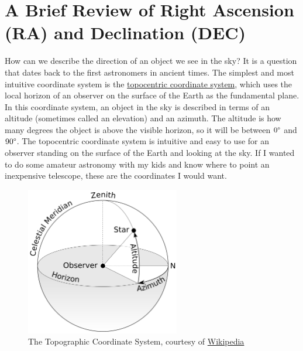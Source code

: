 \section{A Brief Review of Right Ascension (RA) and Declination (DEC)}
\label{section_ra_dec}
How can we describe the direction of an object we see in the sky?
It is a question that dates back to the first astronomers in ancient times.
The simplest and most intuitive coordinate system is the \href{https://en.wikipedia.org/wiki/Horizontal_coordinate_system}{topocentric coordinate system},
which uses the local horizon of an observer on the surface of the Earth as the fundamental plane.
In this coordinate system, an object in the sky is described in terms of an altitude (sometimes called an elevation) and an azimuth.
The altitude is how many degrees the object is above the visible horizon, so it will be between $0 \degree$ and $90 \degree$.
The topocentric coordinate system is intuitive and easy to use for an observer standing on the surface of the Earth and looking at the sky.
If I wanted to do some amateur astronomy with my kids and know where to point an inexpensive telescope, these are the coordinates I would want.
\begin{figure}[hbt!]
\begin{center}
\includegraphics[width=0.6\textwidth]{../figs/web/topocentric_coordinates.png}
\caption[The Topographic Coordinate System]
{The Topographic Coordinate System, courtesy of \href{https://en.wikipedia.org/wiki/Horizontal_coordinate_system}{Wikipedia}}
\end{center}
\end{figure}

